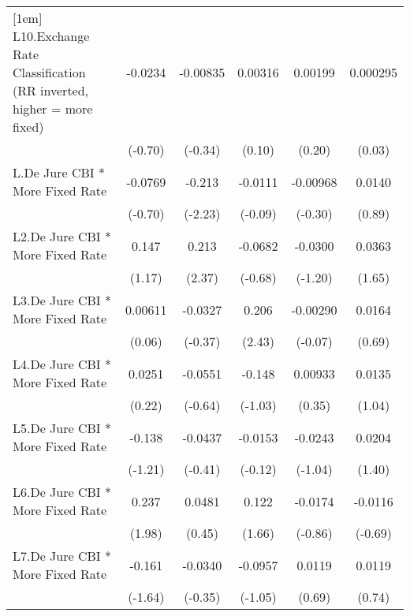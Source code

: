 {\begin{tabular}{l*{5}{c}}
[1em]
L10.Exchange Rate Classification (RR inverted, higher = more fixed)&  -0.0234         & -0.00835         &  0.00316         &  0.00199         & 0.000295         \\
                &  (-0.70)         &  (-0.34)         &   (0.10)         &   (0.20)         &   (0.03)         \\
[1em]
L.De Jure CBI * More Fixed Rate&  -0.0769         &   -0.213\sym{*}  &  -0.0111         & -0.00968         &   0.0140         \\
                &  (-0.70)         &  (-2.23)         &  (-0.09)         &  (-0.30)         &   (0.89)         \\
[1em]
L2.De Jure CBI * More Fixed Rate&    0.147         &    0.213\sym{*}  &  -0.0682         &  -0.0300         &   0.0363         \\
                &   (1.17)         &   (2.37)         &  (-0.68)         &  (-1.20)         &   (1.65)         \\
[1em]
L3.De Jure CBI * More Fixed Rate&  0.00611         &  -0.0327         &    0.206\sym{*}  & -0.00290         &   0.0164         \\
                &   (0.06)         &  (-0.37)         &   (2.43)         &  (-0.07)         &   (0.69)         \\
[1em]
L4.De Jure CBI * More Fixed Rate&   0.0251         &  -0.0551         &   -0.148         &  0.00933         &   0.0135         \\
                &   (0.22)         &  (-0.64)         &  (-1.03)         &   (0.35)         &   (1.04)         \\
[1em]
L5.De Jure CBI * More Fixed Rate&   -0.138         &  -0.0437         &  -0.0153         &  -0.0243         &   0.0204         \\
                &  (-1.21)         &  (-0.41)         &  (-0.12)         &  (-1.04)         &   (1.40)         \\
[1em]
L6.De Jure CBI * More Fixed Rate&    0.237\sym{*}  &   0.0481         &    0.122         &  -0.0174         &  -0.0116         \\
                &   (1.98)         &   (0.45)         &   (1.66)         &  (-0.86)         &  (-0.69)         \\
[1em]
L7.De Jure CBI * More Fixed Rate&   -0.161         &  -0.0340         &  -0.0957         &   0.0119         &   0.0119         \\
                &  (-1.64)         &  (-0.35)         &  (-1.05)         &   (0.69)         &   (0.74)         \\

\end{tabular}}
